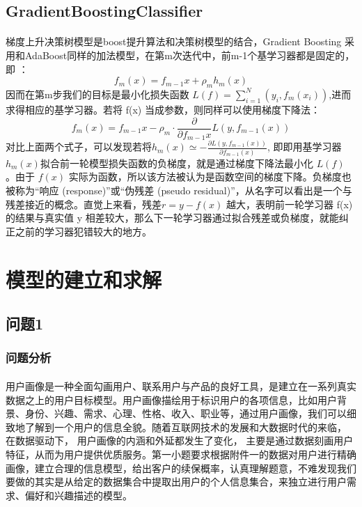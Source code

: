 \documentclass[a4paper]{article}
\begin{document}
		\subsection{GradientBoostingClassifier}
			\paragraph{}梯度上升决策树模型是boost提升算法和决策树模型的结合，Gradient Boosting 采用和AdaBoost同样的加法模型，在第m次迭代中，前m-1个基学习器都是固定的，即 ：
				$$ f_m(x) = f_{m-1}x + \rho_mh_m(x)$$
			因而在第m步我们的目标是最小化损失函数 $ L(f) = \sum_{i = 1}^{N}(y_i,f_m(x_i))$,进而求得相应的基学习器。若将 f(x) 当成参数，则同样可以使用梯度下降法：
				$$ f_m(x) = f_{m-1}x - \rho_m\cdot \frac{\partial}{\partial f_{m-1}x} L(y,f_{m-1}(x))$$
			对比上面两个式子，可以发现若将$h_m(x) \simeq -\frac{\partial L(y,f_{m-1}(x))}{\partial f_{m-1}(x)}$, 即即用基学习器$h_m(x)$拟合前一轮模型损失函数的负梯度，就是通过梯度下降法最小化 $L(f)$ 。由于 $f(x)$ 实际为函数，所以该方法被认为是函数空间的梯度下降。负梯度也被称为“响应 (response)”或“伪残差 (pseudo residual)”，从名字可以看出是一个与残差接近的概念。直觉上来看，残差$ r = y-f(x)$ 越大，表明前一轮学习器 f(x) 的结果与真实值 y 相差较大，那么下一轮学习器通过拟合残差或负梯度，就能纠正之前的学习器犯错较大的地方。
	\section{模型的建立和求解} 
		\subsection{问题1}
			\subsubsection{问题分析}
				\paragraph{}用户画像是一种全面勾画用户、联系用户与产品的良好工具，是建立在一系列真实数据之上的用户目标模型。用户画像描绘用于标识用户的各项信息，比如用户背景、身份、兴趣、需求、心理、性格、收入、职业等，通过用户画像，我们可以细致地了解到一个用户的信息全貌。随着互联网技术的发展和大数据时代的来临， 在数据驱动下， 用户画像的内涵和外延都发生了变化， 主要是通过数据刻画用户特征，从而为用户提供优质服务。第一小题要求根据附件一的数据对用户进行精确画像，建立合理的信息模型，给出客户的续保概率，认真理解题意，不难发现我们要做的其实是从给定的数据集合中提取出用户的个人信息集合，来独立进行用户需求、偏好和兴趣描述的模型。
				
\end{document}

